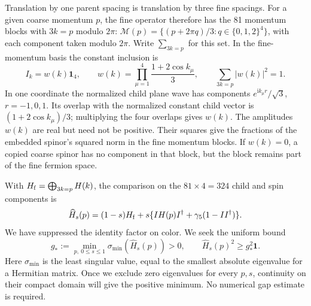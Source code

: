 \documentclass[11pt,a4paper]{article}
\theoremstyle{remark}
\newcommand{\Id}{\mathbf 1}
\newcommand{\ii}{\mathrm i}
\begin{document}
Translation by one parent spacing is translation by three fine
spacings. For a given coarse momentum $p$, the fine operator therefore
has the 81 momentum blocks with $3k=p$ modulo $2\pi$:
$\mathcal M(p)=\{(p+2\pi q)/3:q\in\{0,1,2\}^4\}$, with each
component taken modulo $2\pi$. Write $\sum_{3k=p}$ for this
set. In the fine-momentum basis the constant inclusion is
\begin{equation}
 I_k=w(k)\Id_4,\qquad
 w(k)=\prod_{\mu=1}^4\frac{1+2\cos k_\mu}{3},\qquad
 \sum_{3k=p}|w(k)|^2=1.
\end{equation}
In one coordinate the normalized child plane wave has components
$e^{\ii k_\mu r}/\sqrt3$, $r=-1,0,1$. Its overlap with the
normalized constant child vector is $(1+2\cos k_\mu)/3$; multiplying
the four overlaps gives $w(k)$. The amplitudes $w(k)$ are real but need not be positive. Their squares
give the fractions of the embedded spinor's squared norm in the fine momentum
blocks. If $w(k)=0$, a copied coarse spinor has no component in that
block, but the block remains part of the fine fermion space.

With $H_{\rm f}=\bigoplus_{3k=p}H(k)$, the comparison on the
$81\times4=324$ child and spin components is
\begin{equation}
 \widehat H_s(p)=(1-s)H_{\rm f}
       +s\{IH(p)I^{\dagger}+\gamma_5(1-II^{\dagger})\}.
\end{equation}
We have suppressed the identity factor on color. We seek the uniform
bound
\begin{equation}
 g_*:=\min_{p,\ 0\le s\le1}\sigma_{\min}(\widehat H_s(p))>0,
 \qquad \widehat H_s(p)^2\ge g_*^2\Id .
 \label{app:s:free-gap}
\end{equation}
Here $\sigma_{\min}$ is the least singular value, equal to the
smallest absolute eigenvalue for a Hermitian matrix. Once we exclude
zero eigenvalues for every $p,s$, continuity on their compact domain
will give the positive minimum. No numerical gap estimate is required.
\end{document}
